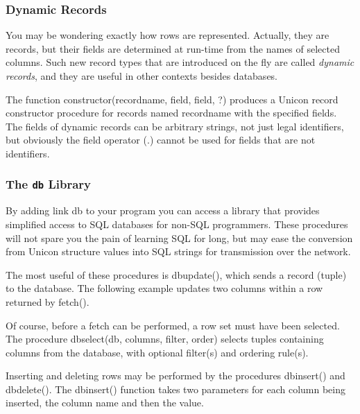 \subsubsection{Dynamic Records}

You may be wondering exactly how rows are represented. Actually, they
are records, but their fields are determined at run-time from the names
of selected columns. Such new record types that are introduced on the
fly are called \textit{dynamic records}, and they are useful in other
contexts besides databases.

The function \textsf{constructor(recordname, field, field, ?)} produces a
Unicon record constructor procedure for records named
\textsf{recordname} with the specified fields. The fields of dynamic
records can be arbitrary strings, not just legal identifiers, but
obviously the field operator (\textsf{.}) cannot be used for fields
that are not identifiers.

\subsubsection[The db Library]{The \texttt{db} Library}
By adding \textsf{link db} to your program you can access a library that
provides simplified access to SQL databases for non-SQL programmers.
These procedures will not spare you the pain of learning SQL for long,
but may ease the conversion from Unicon structure values into SQL
strings for transmission over the network.

The most useful of these procedures is \textsf{dbupdate()}, which sends
a record (tuple) to the database. The following example updates two
columns within a row returned by \textsf{fetch()}.


Of course, before a fetch can be performed, a row set must have been
selected. The procedure \textsf{dbselect(db, columns, filter, order)}
selects tuples containing columns from the database, with optional
filter(s) and ordering rule(s).

Inserting and deleting rows may be performed by the procedures
\textsf{dbinsert()} and \textsf{dbdelete()}. The \textsf{dbinsert()}
function takes two parameters for each column being inserted, the
column name and then the value.

